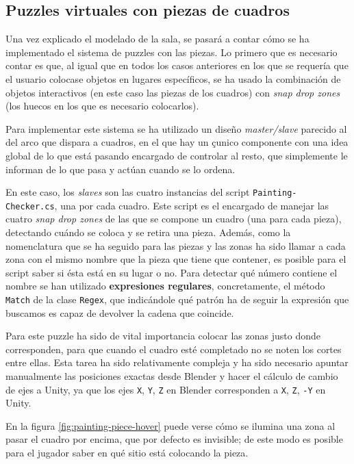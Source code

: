 \subsection{Puzzles virtuales con piezas de cuadros}

Una vez explicado el modelado de la sala, se pasará a contar cómo se ha implementado el sistema de puzzles con las piezas. Lo primero que es necesario contar es que, al igual que en todos los casos anteriores en los que se requería que el usuario colocase objetos en lugares específicos, se ha usado la combinación de objetos interactivos (en este caso las piezas de los cuadros) con \textit{snap drop zones} (los huecos en los que es necesario colocarlos).

Para implementar este sistema se ha utilizado un diseño \textit{master/slave} parecido al del arco que dispara a cuadros, en el que hay un çunico componente con una idea global de lo que está pasando encargado de controlar al resto, que simplemente le informan de lo que pasa y actúan cuando se lo ordena.

En este caso, los \textit{slaves} son las cuatro instancias del script \texttt{Painting-} \texttt{Checker.cs}, una por cada cuadro. Este script es el encargado de manejar las cuatro \textit{snap drop zones} de las que se compone un cuadro (una para cada pieza), detectando cuándo se coloca y se retira una pieza. Además, como la nomenclatura que se ha seguido para las piezas y las zonas ha sido llamar a cada zona con el mismo nombre que la pieza que tiene que contener, es posible para el script saber si ésta está en su lugar o no. Para detectar qué número contiene el nombre se han utilizado \textbf{expresiones regulares}, concretamente, el método \texttt{Match} de la clase \texttt{Regex}, que indicándole qué patrón ha de seguir la expresión que buscamos es capaz de devolver la cadena que coincide.

Para este puzzle ha sido de vital importancia colocar las zonas justo donde corresponden, para que cuando el cuadro esté completado no se noten los cortes entre ellas. Esta tarea ha sido relativamente compleja y ha sido necesario apuntar manualmente las posiciones exactas desde Blender y hacer el cálculo de cambio de ejes a Unity, ya que los ejes \texttt{X}, \texttt{Y}, \texttt{Z} en Blender corresponden a \texttt{X}, \texttt{Z}, \texttt{-Y} en Unity.

En la figura \ref{fig:painting-piece-hover} puede verse cómo se ilumina una zona al pasar el cuadro por encima, que por defecto es invisible; de este modo es posible para el jugador saber en qué sitio está colocando la pieza.

